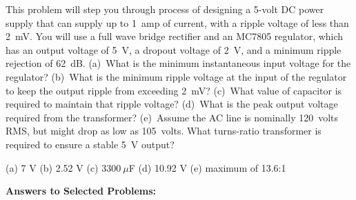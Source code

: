 \begin{Exercise}
This problem will step you through process of designing a 5-volt DC power supply that can supply up to 1~amp of current, with a ripple voltage of less than 2~mV.  You will use a full wave bridge rectifier and an MC7805 regulator, which has an output voltage of 5~V, a dropout voltage of 2~V, and a minimum ripple rejection of 62~dB.  
(a)~What is the minimum instantaneous input voltage for the regulator?  
(b)~What is the minimum ripple voltage at the input of the regulator to keep the output ripple from exceeding 2~mV?  
(c)~What value of capacitor is required to maintain that ripple voltage?  
(d)~What is the peak output voltage required from the transformer?  
(e)~Assume the AC line is nominally 120~volts RMS, but might drop as low as 105~volts.  What turns-ratio transformer is required to ensure a stable 5~V output?
\end{Exercise}
\begin{Answer}
(a) 7 V (b) 2.52 V (c) $3300~\mu$F (d) 10.92 V (e) maximum of 13.6:1 

\end{Answer}


\vspace{0.7in}

\textbf{Answers to Selected {\thesubsection} Problems:}
\label{C_L_and_AC_prob_answers}
\shipoutAnswer

\cleardoublepage
